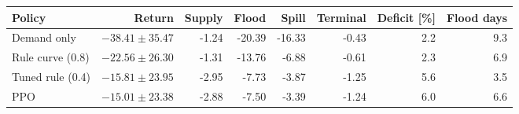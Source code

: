 \begin{tabular}{lrrrrrrr}
\toprule
Policy & Return & Supply & Flood & Spill & Terminal & Deficit [\%] & Flood days \\
\midrule
Demand only & $-38.41\pm35.47$ & -1.24 & -20.39 & -16.33 & -0.43 & 2.2 & 9.3 \\
Rule curve (0.8) & $-22.56\pm26.30$ & -1.31 & -13.76 & -6.88 & -0.61 & 2.3 & 6.9 \\
Tuned rule (0.4) & $-15.81\pm23.95$ & -2.95 & -7.73 & -3.87 & -1.25 & 5.6 & 3.5 \\
PPO & $-15.01\pm23.38$ & -2.88 & -7.50 & -3.39 & -1.24 & 6.0 & 6.6 \\
\bottomrule
\end{tabular}
